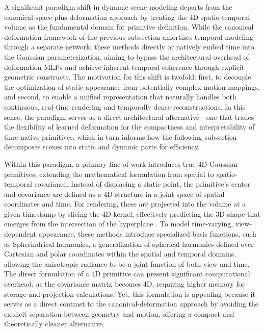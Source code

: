\documentclass[11pt,a4paper]{article}
\begin{document}
A significant paradigm shift in dynamic scene modeling departs from the canonical-space-plus-deformation approach by treating the 4D spatio-temporal volume as the fundamental domain for primitive definition. While the canonical deformation framework of the previous subsection amortizes temporal modeling through a separate network, these methods directly or natively embed time into the Gaussian parameterization, aiming to bypass the architectural overhead of deformation MLPs and achieve inherent temporal coherence through explicit geometric constructs. The motivation for this shift is twofold: first, to decouple the optimization of static appearance from potentially complex motion mappings, and second, to enable a unified representation that naturally handles both continuous, real-time rendering and temporally dense reconstructions. In this sense, the paradigm serves as a direct architectural alternative---one that trades the flexibility of learned deformation for the compactness and interpretability of time-native primitives, which in turn informs how the following subsection decomposes scenes into static and dynamic parts for efficiency.

Within this paradigm, a primary line of work introduces true 4D Gaussian primitives, extending the mathematical formulation from spatial to spatio-temporal covariance. Instead of displacing a static point, the primitive's center and covariance are defined as a 4D structure in a joint space of spatial coordinates and time. For rendering, these are projected into the volume at a given timestamp by slicing the 4D kernel, effectively predicting the 3D shape that emerges from the intersection of the hyperplane \cite{arxiv:2403.14244v1}. To model time-varying, view-dependent appearance, these methods introduce specialized basis functions, such as Spherindrical harmonics, a generalization of spherical harmonics defined over Cartesian and polar coordinates within the spatial and temporal domains, allowing the anisotropic radiance to be a joint function of both view and time. The direct formulation of a 4D primitive can present significant computational overhead, as the covariance matrix becomes 4D, requiring higher memory for storage and projection calculations. Yet, this formulation is appealing because it serves as a direct contrast to the canonical-deformation approach by avoiding the explicit separation between geometry and motion, offering a compact and theoretically cleaner alternative.
\end{document}
